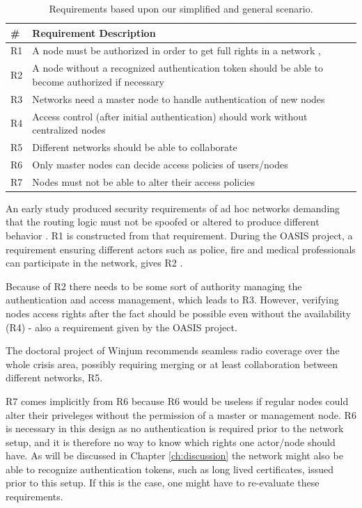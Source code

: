 \begin{table}[ht!]
	\centering
	\begin{tabular*}{\textwidth}{ | p{5mm} | p{388pt} | }
	\hline
	\textbf{\#} & \textbf{Requirement Description}\\\hline
		R1 & A node must be authorized in order to get full rights in a network \cite{dahill2001secure}, \cite{sanzgiri2002secure}\\\hline
		R2 & A node without a recognized authentication token should be able to become authorized if necessary\\\hline
		R3 & Networks need a master node to handle authentication of new nodes\\\hline
		R4 & Access control (after initial authentication) should work without centralized nodes\\\hline
		R5 & Different networks should be able to collaborate \cite{ffi_2005_04015}\\\hline
		R6 & Only master nodes can decide access policies of users/nodes\\\hline
		R7 & Nodes must not be able to alter their access policies\\\hline
	\end{tabular*}
	\caption{Requirements based upon our simplified and general scenario.}
	\label{tab:our_req}
\end{table}

An early study produced security requirements of ad hoc networks demanding
that the routing logic must not be spoofed or altered to produce different
behavior \cite{dahill2001secure}. R1 is constructed from that requirement.
During the OASIS project, a requirement ensuring different actors such as
police, fire and medical professionals can participate in the network, gives R2
\cite{5683058}.

Because of R2 there needs to be some sort of authority managing the
authentication and access management, which leads to R3. However, verifying
nodes access rights after the fact should be possible even without the
availability (R4) - also a requirement given by the OASIS project.

The doctoral project of Winjum recommends seamless radio coverage over the whole
crisis area, possibly requiring merging or at least collaboration between
different networks, R5.

R7 comes implicitly from R6 because R6 would be useless if regular nodes could
alter their priveleges without the permission of a master or management node. R6
is necessary in this design as no authentication is required prior to the
network setup, and it is therefore no way to know which rights one actor/node
should have. As will be discussed in Chapter \ref{ch:discussion} the network
might also be able to recognize authentication tokens, such as long lived
certificates, issued prior to this setup. If this is the case, one might have to
re-evaluate these requirements.

